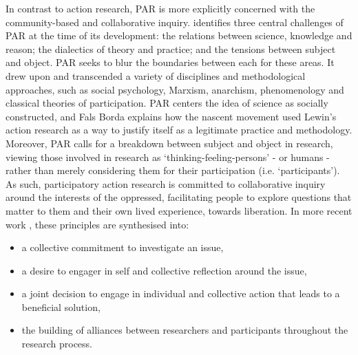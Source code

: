 In contrast to action research, PAR is more explicitly concerned with the community-based and collaborative inquiry. \citet{fals_borda_kinsey_2001} identifies three central challenges of PAR at the time of its development: the relations between science, knowledge and reason; the dialectics of theory and practice; and the tensions between subject and object. PAR seeks to blur the boundaries between each for these areas. It drew upon and transcended a variety of disciplines and methodological approaches, such as social psychology, Marxism, anarchism, phenomenology and classical theories of participation. PAR centers the idea of science as socially constructed, and Fals Borda explains how the nascent movement used Lewin’s action research as a way to justify itself as a legitimate practice and methodology. Moreover, PAR calls for a breakdown between subject and object in research, viewing those involved in research as ‘thinking-feeling-persons’ - or humans - rather than merely considering them for their participation (i.e. ‘participants’). As such, participatory action research is committed to collaborative inquiry around the interests of the oppressed, facilitating people to explore questions that matter to them and their own lived experience, towards liberation. In more recent work \citep{mcintyre_participatory_2007}, these principles are synthesised into:
\begin{itemize}
    \item a collective commitment to investigate an issue,
    \item a desire to engager in self and collective reflection around the issue,
    \item a joint decision to engage in individual and collective action that leads to a beneficial solution,
    \item the building of alliances between researchers and participants throughout the research process.
\end{itemize}

